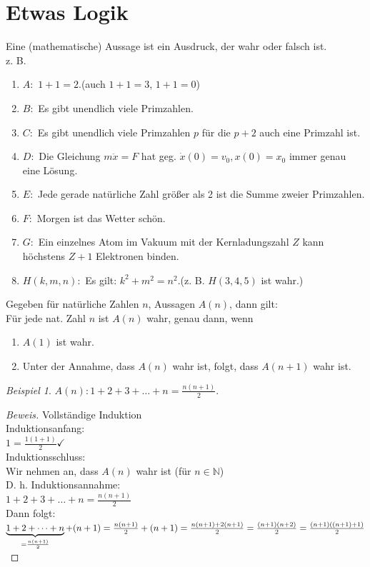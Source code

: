 \documentclass[12pt,a4paper,titlepage]{article} %
\theoremstyle{definition}
\theoremstyle{remark}
\newtheorem*{bsp}{Beispiel}
\newenvironment{bew}{\begin{proof}[Beweis]}{\end{proof}}
\begin{document}
\section{Etwas Logik}
Eine (mathematische) Aussage ist ein Ausdruck, der wahr oder falsch ist.\\
z. B.
\begin{enumerate}
  \item $A :$ \glqq $1+1=2$.\grqq (auch \glqq $1+1=3$\grqq, \glqq $1+1=0$\grqq)
  \item $B :$ \glqq Es gibt unendlich viele Primzahlen.\grqq
  \item $C :$ \glqq Es gibt unendlich viele Primzahlen $p$ für die $p + 2$ auch eine Primzahl ist.\grqq
  \item $D :$ \glqq Die Gleichung $m \ddot{x} = F$ hat geg. $\dot{x}(0) = v_0, x(0) = x_0$ immer genau eine Lösung.\grqq
  \item $E :$ \glqq Jede gerade natürliche Zahl größer als 2 ist die Summe zweier Primzahlen.\grqq
  \item $F :$ \glqq Morgen ist das Wetter schön.\grqq
  \item $G :$ \glqq Ein einzelnes Atom im Vakuum mit der Kernladungszahl $Z$ kann höchstens $Z+1$ Elektronen binden.\grqq
  \item $H(k,m,n) :$ \glqq Es gilt: $k^2 + m^2 = n^2$.\grqq (z. B. $H(3,4,5)$ ist wahr.)    
\end{enumerate}
Gegeben für natürliche Zahlen $n$, Aussagen $A(n)$, dann gilt:\\
Für jede nat. Zahl $n$ ist $A(n)$ wahr, genau dann, wenn 
\begin{enumerate}
  \item $A(1)$ ist wahr.
  \item Unter der Annahme, dass $A(n)$ wahr ist, folgt, dass $A(n+1)$ wahr ist.
\end{enumerate}
\begin{bsp}
	$A(n): 1+2+3+\dots+n=\frac{n(n+1)}{2}$.
\end{bsp}
\begin{bew} 
	Vollständige Induktion\\
	Induktionsanfang:\\
	$1 = \frac{1(1+1)}{2} \checkmark$\\
	Induktionsschluss:\\
	Wir nehmen an, dass $A(n)$ wahr ist (für $n\in\mathbb{N}$)\\
	D. h. Induktionsannahme:\\
	$1+2+3+\dots+n=\frac{n(n+1)}{2}$\\
	Dann folgt:\\
	$\underbrace{1+2+\dots+n}_{=\frac{n(n+1)}{2}}+(n+1)=\frac{n(n+1)}{2}+(n+1) \\
	=\frac{n(n+1) + 2(n+1)}{2} = \frac{(n+1)(n+2)}{2} = \frac{(n+1)((n+1)+1)}{2}$
\end{bew}
\end{document}
